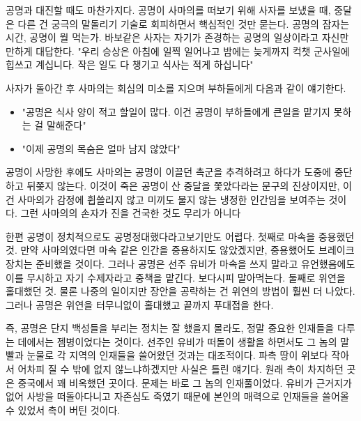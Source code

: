 공명과 대진할 때도 마찬가지다.
공명이 사마의를 떠보기 위해 사자를 보냈을 때, 중달은 다른 건 궁극의 말돌리기 기술로 회피하면서 핵심적인 것만 묻는다.
공명의 잠자는 시간, 공명이 뭘 먹는가.
바보같은 사자는 자기가 존경하는 공명의 일상이라고 자신만만하게 대답한다.
"우리 승상은 아침에 일찍 일어나고 밤에는 늦게까지 컥챗 군사일에 힙쓰고 계십니다. 작은 일도 다 챙기고 식사는 적게 하십니다"
\vspace{5mm}

사자가 돌아간 후 사마의는 회심의 미소를 지으며 부하들에게 다음과 같이 얘기한다.
\begin{itemize}
    \item[] "공명은 식사 양이 적고 할일이 많다. 이건 공명이 부하들에게 큰일을 맡기지 못하는 걸 말해준다"
    \item[] "이제 공명의 목숨은 얼마 남지 않았다"
\end{itemize}
\vspace{5mm}

공명이 사망한 후에도 사마의는 공명이 이끌던 촉군을 추격하려고 하다가 도중에 중단하고 뒤쫒지 않는다.
이것이 죽은 공명이 산 중달을 쫓았다라는 문구의 진상이지만, 이건 사마의가 감정에 휩쓸리지 않고 미끼도 물지 않는 냉정한 인간임을 보여주는 것이다.
그런 사마의의 손자가 진을 건국한 것도 무리가 아니다
\vspace{5mm}

한편 공명이 정치적으로도 공명정대했다라고보기만도 어렵다.
첫째로 마속을 중용했던 것. 만약 사마의였다면 마속 같은 인간을 중용하지도 않았겠지만, 중용했어도 브레이크 장치는 준비했을 것이다.
그러나 공명은 선주 유비가 마속을 쓰지 말라고 유언했음에도 이를 무시하고 자기 수제자라고 중책을 맡긴다. 보다시피 말아먹는다.
둘째로 위연을 홀대했던 것. 물론 나중의 일이지만 장안을 공략하는 건 위연의 방법이 훨씬 더 나았다.
그러나 공명은 위연을 터무니없이 홀대했고 끝까지 푸대접을 한다.
\vspace{5mm}

즉, 공명은 단지 백성들을 부리는 정치는 잘 했을지 몰라도, 정말 중요한 인재들을 다루는 데에서는 젬병이었다는 것이다.
선주인 유비가 떠돌이 생활을 하면서도 그 놈의 말빨과 눈물로 각 지역의 인재들을 쓸어왔던 것과는 대조적이다.
파촉 땅이 위보다 작아서 어차피 질 수 밖에 없지 않느냐하겠지만 사실은 틀린 얘기다.
원래 촉이 차지하던 곳은 중국에서 꽤 비옥했던 곳이다. 문제는 바로 그 놈의 인재풀이었다.
유비가 근거지가 없어 사방을 떠돌아다니고 자존심도 죽였기 때문에 본인의 매력으로 인재들을 쓸어올 수 있었서 촉이 버틴 것이다.
\vspace{5mm}






